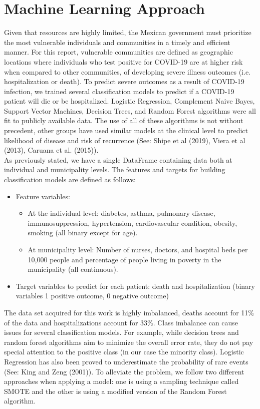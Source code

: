 \documentclass[hidelinks,10pt]{article}
\begin{document}
	
	\section{Machine Learning Approach}\label{sec_empiricalid}
	Given that resources are highly limited, the Mexican government must prioritize the most vulnerable individuals and communities in a timely and efficient manner. For this report, vulnerable communities are defined as geographic locations where individuals who test positive for COVID-19 are at higher risk when compared to other communities, of developing severe illness outcomes (i.e. hospitalization or death).
	To predict severe outcomes as a result of COVID-19 infection, we trained several classification models to predict if a COVID-19 patient will die or be hospitalized. Logistic Regression, Complement Naive Bayes, Support Vector Machines, Decision Trees, and Random Forest algorithms were all fit to publicly available data. The use of all of these algorithms is not without precedent, other groups have used similar models at the clinical level to predict likelihood of disease and risk of recurrence (See: Shipe et al (2019), Viera et al (2013), Caruana et al. (2015)).  
	\\
	As previously stated, we have a single DataFrame containing data both at individual and municipality levels. The features and targets for building classification models are defined as follows:
	\begin{itemize}
		\item Feature variables:
		\begin{itemize}
			\item At the individual level: diabetes, asthma, pulmonary disease, immunosuppression, hypertension, cardiovascular condition, obesity,  smoking (all binary except for age).
			\item At municipality level: Number of nurses, doctors, and hospital beds per 10,000 people and percentage of people living in poverty in the municipality (all continuous).
		\end{itemize}
	\item Target variables to predict for each patient: death and hospitalization (binary variables 1 positive outcome, 0 negative outcome)
	\end{itemize}
The data set acquired for this work is highly imbalanced, deaths account for 11\% of the data and hospitalizations account for 33\%. Class imbalance can cause issues for several classification models. For example, while decision trees and random forest algorithms aim to minimize the overall error rate, they do not pay special attention to the positive class (in our case the minority class). Logistic Regression has also been proved to underestimate the probability of rare events (See: King and Zeng (2001)). To alleviate the problem, we follow two different approaches when applying a model: one is using a sampling technique called SMOTE and the other is using a modified version of the Random Forest algorithm. \\
\end{document}
